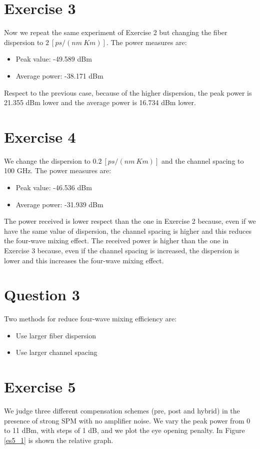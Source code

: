 \documentclass[a4paper,10pt]{report}
\begin{document}
\section*{Exercise 3}
Now we repeat the same experiment of Exercise 2 but changing the fiber dispersion to $2 \ [ps/(nm \ Km)]$.
The power measures are:

\begin{itemize}
 \item Peak value: -49.589 dBm		%
 \item Average power: -38.171 dBm	%
\end{itemize}

Respect to the previous case, because of the higher dispersion, the peak power is 21.355 dBm lower and the average power is 16.734 dBm lower.


\section*{Exercise 4}
We change the dispersion to $0.2 \ [ps/(nm \ Km)]$ and the channel spacing to 100 GHz.
The power measures are:

\begin{itemize}
 \item Peak value: -46.536 dBm		%
 \item Average power: -31.939 dBm	%
\end{itemize}

The power received is lower respect than the one in Exercise 2 because, even if we have the same value of dispersion, the channel spacing is higher and this
reduces the four-wave mixing effect.
The received power is higher than the one in Exercise 3 because, even if the channel spacing is increased, the dispersion is lower and this increases
the four-wave mixing effect.

\section*{Question 3}
Two methods for reduce four-wave mixing efficiency are:
\begin{itemize}
 \item Use larger fiber dispersion
 \item Use larger channel spacing
\end{itemize}


\section*{Exercise 5}
We judge three different compensation schemes (pre, post and hybrid) in the presence of strong SPM with no amplifier noise.
We vary the peak power from 0 to 11 dBm, with steps of 1 dB, and we plot the eye opening penalty.
In Figure \ref{es5_1} is shown the relative graph.
\end{document}
